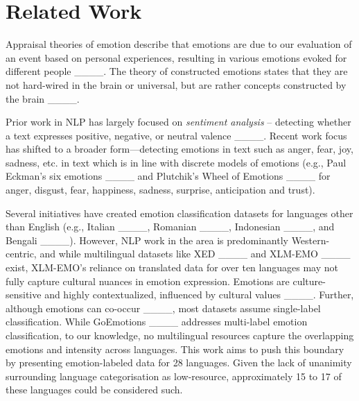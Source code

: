 \section{Related Work}
Appraisal theories of emotion describe that emotions are due to our evaluation of an event based on personal experiences, resulting in various emotions evoked for different people ____. The theory of constructed emotions states that they are not hard-wired in the brain or universal, but are rather concepts constructed by the brain ____. 

Prior work in NLP has largely focused on \textit{sentiment analysis} -- detecting whether a text expresses positive, negative, or neutral valence ____. Recent work focus has shifted to a broader form—detecting emotions in text such as anger, fear, joy, sadness, etc. in text which is in line with discrete models of emotions (e.g., Paul Eckman's six emotions ____ and Plutchik's Wheel of Emotions ____ for anger, disgust, fear, happiness, sadness, surprise, anticipation and trust).

Several initiatives have created emotion classification datasets for languages other than English (e.g., Italian ____, Romanian ____,
Indonesian ____, and Bengali ____). However, NLP work in the area is predominantly Western-centric, and while multilingual datasets like XED ____ and XLM-EMO ____ exist, XLM-EMO's reliance on translated data for over ten languages may not fully capture cultural nuances in emotion expression. Emotions are culture-sensitive and highly contextualized, influenced by cultural values ____. Further, although emotions can co-occur ____, most datasets assume single-label classification. While GoEmotions ____ addresses multi-label emotion classification, to our knowledge, no multilingual resources capture the overlapping emotions and intensity across languages.
This work aims to push this boundary by presenting emotion-labeled data for 28 languages. Given the lack of unanimity surrounding language categorisation as low-resource, approximately 15 to 17 of these languages could be considered such. 



